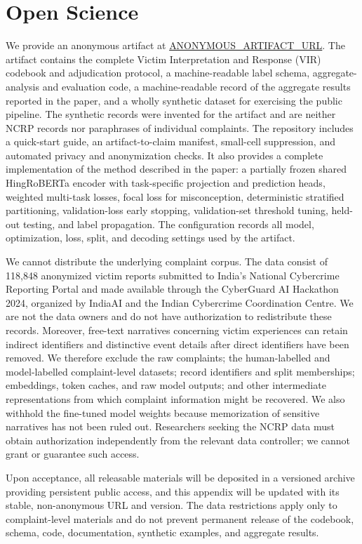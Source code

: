 \section{Open Science}
\label{app:open-science}

We provide an anonymous artifact at
\url{ANONYMOUS_ARTIFACT_URL}. The artifact contains the complete Victim
Interpretation and Response (VIR) codebook and adjudication protocol, a
machine-readable label schema, aggregate-analysis and evaluation code, a
machine-readable record of the aggregate results reported in the paper, and a
wholly synthetic dataset for exercising the public pipeline. The synthetic
records were invented for the artifact and are neither NCRP records nor
paraphrases of individual complaints. The repository includes a quick-start
guide, an artifact-to-claim manifest, small-cell suppression, and automated
privacy and anonymization checks. It also provides a complete implementation
of the method described in the paper: a partially frozen shared HingRoBERTa
encoder with task-specific projection and prediction heads, weighted
multi-task losses, focal loss for misconception, deterministic stratified
partitioning, validation-loss early stopping, validation-set threshold tuning,
held-out testing, and label propagation. The configuration records all model,
optimization, loss, split, and decoding settings used by the artifact.

We cannot distribute the underlying complaint corpus. The data consist of
118,848 anonymized victim reports submitted to India's National Cybercrime
Reporting Portal and made available through the CyberGuard AI Hackathon 2024,
organized by IndiaAI and the Indian Cybercrime Coordination Centre. We are not
the data owners and do not have authorization to redistribute these records.
Moreover, free-text narratives concerning victim experiences can retain
indirect identifiers and distinctive event details after direct identifiers
have been removed. We therefore exclude the raw complaints; the human-labelled
and model-labelled complaint-level datasets; record identifiers and split
memberships; embeddings, token caches, and raw model outputs; and other
intermediate representations from which complaint information might be
recovered. We also withhold the fine-tuned model weights because memorization
of sensitive narratives has not been ruled out. Researchers seeking the NCRP
data must obtain authorization independently from the relevant data controller;
we cannot grant or guarantee such access.

Upon acceptance, all releasable materials will be deposited in a versioned
archive providing persistent public access, and this appendix will be updated
with its stable, non-anonymous URL and version. The data restrictions apply
only to complaint-level materials and do not prevent permanent release of the
codebook, schema, code, documentation, synthetic examples, and aggregate
results.
